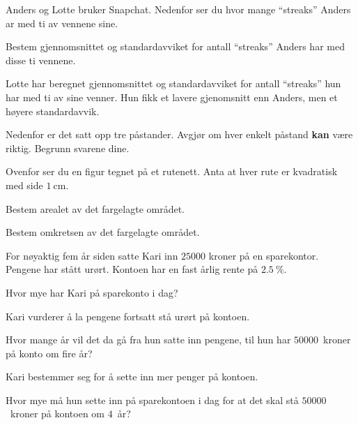 \Oppgave[4] %

Anders og Lotte bruker Snapchat. Nedenfor ser du hvor mange \enquote{streaks}
Anders ar med ti av vennene sine.

\begin{oppgaver}
   Bestem gjennomsnittet og standardavviket for antall
    \enquote{streaks} Anders har med disse ti vennene.
\end{oppgaver}

Lotte har beregnet gjennomsnittet og standardavviket for antall
\enquote{streaks} hun har med ti av sine venner. Hun fikk et lavere gjenomsnitt
enn Anders, men et høyere standardavvik.

\begin{oppgaver}
   Nedenfor er det satt opp tre påstander. Avgjør om hver enkelt
    påstand \textbf{kan} være riktig. Begrunn svarene dine.
\end{oppgaver}


\Oppgave[4] %

Ovenfor ser du en figur tegnet på et rutenett. Anta at hver rute er kvadratisk
med side $\SI{1}{\cm}$.

\begin{oppgaver}
   Bestem arealet av det fargelagte området.
\end{oppgaver}

\begin{oppgaver}
   Bestem omkretsen av det fargelagte området.
\end{oppgaver}


\Oppgave[6] %

For nøyaktig fem år siden satte Kari inn $\num{25000}$ kroner på en sparekontor.
Pengene har stått urørt. Kontoen har en fast årlig rente på
$\SI{2.5}{\percent}$.

\begin{oppgaver}
   Hvor mye har Kari på sparekonto i dag?
\end{oppgaver}

Kari vurderer å la pengene fortsatt stå urørt på kontoen.

\begin{oppgaver}
   Hvor mange år vil det da gå fra hun satte inn pengene, til hun har
    $\num{50000}$~kroner på konto om fire år?
\end{oppgaver}

Kari bestemmer seg for å sette inn mer penger på kontoen.

\begin{oppgaver}
   Hvor mye må hun sette inn på sparekontoen i dag for at det skal stå
    $\num{50000}$~kroner på kontoen om $4$~år?
\end{oppgaver}


